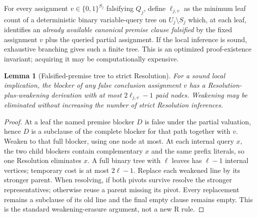 \documentclass[11pt]{article}
\newtheorem{lemma}[theorem]{Lemma}
\begin{document}
For every assignment $v\in\{0,1\}^{S_j}$ falsifying $Q_j$, define $\ell_{j,v}$ as the minimum leaf count of a deterministic binary variable-query tree on $U_j\setminus S_j$ which, at each leaf, identifies an \emph{already available canonical premise clause falsified} by the fixed assignment $v$ plus the queried partial assignment. If the local inference is sound, exhaustive branching gives such a finite tree. This is an optimized proof-existence invariant; acquiring it may be computationally expensive.

\begin{lemma}[Falsified-premise tree to strict Resolution]
For a sound local implication, the blocker of any false conclusion assignment $v$ has a Resolution-plus-weakening derivation with at most $2\ell_{j,v}-1$ paid nodes. Weakening may be eliminated without increasing the number of strict Resolution inferences.
\end{lemma}
\begin{proof}
At a leaf the named premise blocker $D$ is false under the partial valuation, hence $D$ is a subclause of the complete blocker for that path together with $v$. Weaken to that full blocker, using one node at most. At each internal query $x$, the two child blockers contain complementary $x$ and the same prefix literals, so one Resolution eliminates $x$. A full binary tree with $\ell$ leaves has $\ell-1$ internal vertices; temporary cost is at most $2\ell-1$. Replace each weakened line by its stronger parent. When resolving, if both pivots survive resolve the stronger representatives; otherwise reuse a parent missing its pivot. Every replacement remains a subclause of its old line and the final empty clause remains empty. This is the standard weakening-erasure argument, not a new R rule.
\end{proof}
\end{document}
